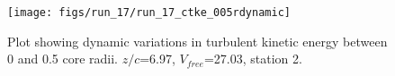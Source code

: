 \begin{figure}[H]
\centering
\texttt{[image: figs/run\_17/run\_17\_ctke\_005rdynamic]}
\caption{Plot showing dynamic variations in turbulent kinetic energy between 0 and 0.5 core radii. $z/c$=6.97, $V_{free}$=27.03, station 2.}
\label{fig:run_17_ctke_005rdynamic}
\end{figure}


